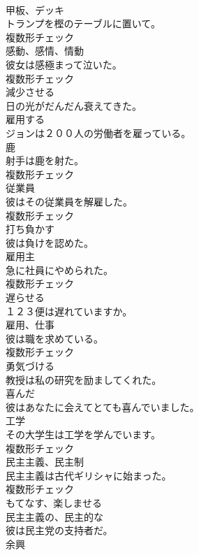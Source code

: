\documentclass[8pt]{extreport}
\begin{document}
\begin{CJK}{UTF8}{min}
\\	[名詞]	甲板、デッキ	
\\	トランプを樫のテーブルに置いて。	
\\	複数形チェック
\\	[名詞]	感動、感情、情動	
\\	彼女は感極まって泣いた。	
\\	複数形チェック
\\	[動詞]	減少させる	
\\	日の光がだんだん衰えてきた。	
\\	[動詞]	雇用する	
\\	ジョンは２００人の労働者を雇っている。	
\\	[名詞]	鹿	
\\	射手は鹿を射た。	
\\	複数形チェック
\\	[名詞]	従業員	
\\	彼はその従業員を解雇した。	
\\	複数形チェック
\\	[動詞]	打ち負かす	
\\	彼は負けを認めた。	
\\	[名詞]	雇用主	
\\	急に社員にやめられた。	
\\	複数形チェック
\\	[動詞]	遅らせる	
\\	１２３便は遅れていますか。	
\\	[名詞]	雇用、仕事	
\\	彼は職を求めている。	
\\	複数形チェック
\\	[動詞]	勇気づける	
\\	教授は私の研究を励ましてくれた。	
\\	[形容詞]	喜んだ	
\\	彼はあなたに会えてとても喜んでいました。	
\\	[名詞]	工学	
\\	その大学生は工学を学んでいます。	
\\	複数形チェック
\\	[名詞]	⺠主主義、⺠主制	
\\	民主主義は古代ギリシャに始まった。	
\\	複数形チェック
\\	[動詞]	もてなす、楽しませる	
\\	[形容詞]	⺠主主義の、⺠主的な	
\\	彼は民主党の支持者だ。	
\\	[名詞]	余興	

\end{CJK}
\end{document}
